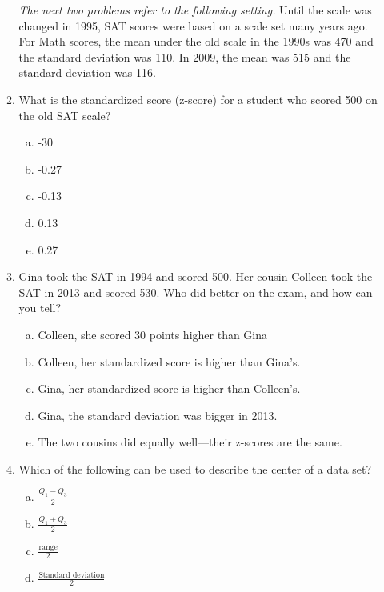 \documentclass[a4paper,12pt,twoside]{book}
\begin{document}
\begin{itemize}
\begin{enumerate}
  \textit{The next two problems refer to the following setting.}  Until the scale was changed in 1995, SAT scores were based on a scale set many years ago. For Math scores, the mean under the old scale in the 1990s was 470 and the standard deviation was 110. In 2009, the mean was 515 and the standard deviation was 116.
  
  \item  What is the standardized score (z-score) for a student who scored 500 on the old SAT scale?
  \begin{multicols}{5}
  \begin{enumerate}[(a)]
      \item -30
      \item -0.27
      \item -0.13
      \item 0.13
      \item 0.27
  \end{enumerate}
  \end{multicols}
   
 \item  Gina took the SAT in 1994 and scored 500. Her cousin Colleen took the SAT in 2013 and scored 530. Who did better on the exam, and how can you tell?
    \begin{enumerate}[(a)]
        \item  Colleen, she scored 30 points higher than Gina
        \item  Colleen, her standardized score is higher than Gina’s.
        \item Gina, her standardized score is higher than Colleen’s.
        \item Gina, the standard deviation was bigger in 2013.
        \item The two cousins did equally well—their z-scores are the same.
    \end{enumerate}      
   \vspace{0.3cm}
   
    \item Which of the following can be used to describe the center of a data set?
      \begin{enumerate}[(a)]
          \item $\frac{Q_1-Q_3}{2}$
          \item $\frac{Q_1+Q_3}{2}$
          \item $\frac{\text{range}}{2}$
          \item $\frac{\text{Standard deviation}}{2}$
      \end{enumerate}
      \vspace{0.3cm}
      

\end{enumerate}
\end{itemize}
\end{document}
